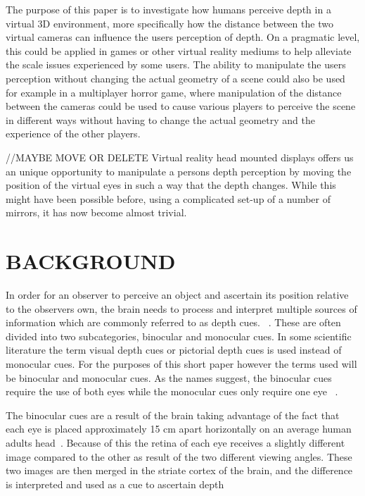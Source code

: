 \documentclass[tog]{acmsiggraph}
\begin{document}
The purpose of this paper is to investigate how humans perceive depth in a virtual 3D environment, more specifically how the distance between the two virtual cameras can influence the users perception of depth. On a pragmatic level, this could be applied in games or other virtual reality mediums to help alleviate the scale issues experienced by some users. The ability to manipulate the users perception without changing the actual geometry of a scene could also be used for example in a multiplayer horror game, where manipulation of the distance between the cameras could be used to cause various players to perceive the scene in different ways without having to change the actual geometry and the experience of the other players.

//MAYBE MOVE OR DELETE
Virtual reality head mounted displays offers us an unique opportunity to manipulate a persons depth perception by moving the position of the virtual eyes in such a way that the depth changes. While this might have been possible before, using a complicated set-up of a number of mirrors, it has now become almost trivial.  


\section{BACKGROUND}
In order for an observer to perceive an object and ascertain its position relative to the observers own, the brain needs to process and interpret multiple sources of information which are commonly referred to as depth cues. ~\cite {Reichelt et al:2010:DPHV}. These are often divided into two subcategories, binocular and monocular cues. In some scientific literature the term visual depth cues or pictorial depth cues is used instead of monocular cues. For the purposes of this short paper however the terms used will be binocular and monocular cues. As the names suggest, the binocular cues require the use of both eyes while the monocular cues only require one eye ~\cite {Pfautz:2002:DPCG}.

The binocular cues are a result of the brain taking advantage of the fact that each eye is placed approximately 15 cm apart horizontally on an average human adults head~\cite {Akai:1998:DPIRVR}. Because of this the retina of each eye receives a slightly different image compared to the other as result of the two different viewing angles. These two images are then merged in the striate cortex of the brain, and the difference is interpreted and used as a cue to ascertain depth ~\cite{Reichelt et al:2010:DPHV} 
\end{document}
